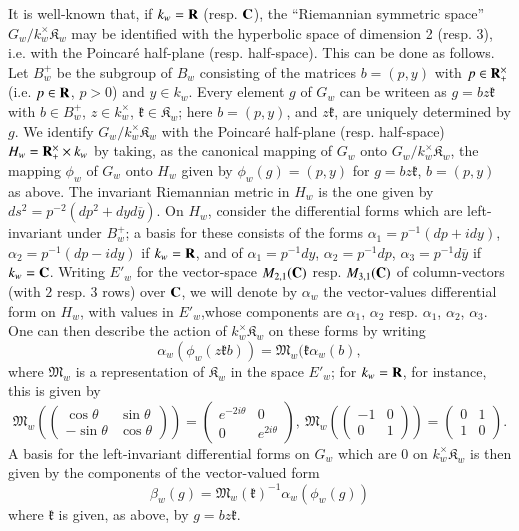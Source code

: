 It is well-known that, if $k_{w}=\mathbf{R}$ (resp. $\mathbf{C}$), the ``Riemannian symmetric space'' $G_{w}/k^{\times}_{w}\mathfrak{K}_{w}$ may be identified with the hyperbolic space of dimension 2 (resp. 3), i.e. with the Poincar\'e half-plane (resp. half-space). This can be done as follows. Let $B^{+}_{w}$ be the subgroup of $B_{w}$ consisting of the matrices $b=(p,y)$ with $p\in \mathbf{R}^{\times}_{+}$ (i.e. $p\in \mathbf{R}$, $p>0$) and $y\in k_{w}$. Every element $g$ of $G_{w}$ can be writeen as $g=bz\mathfrak{k}$ with $b\in B^{+}_{w}$, $z\in k^{\times}_{w}$, $\mathfrak{k}\in \mathfrak{K}_{w}$; here $b=(p,y)$, and $z\mathfrak{k}$, are uniquely determined by $g$. We identify $G_{w}/k^{\times}_{w}\mathfrak{K}_{w}$ with the Poincar\'e half-plane (resp. half-space) $H_{w}=\mathbf{R}^{\times}_{+}\times k_{w}$ by taking, as the canonical mapping of $G_{w}$ onto $G_{w}/k^{\times}_{w}\mathfrak{K}_{w}$, the mapping $\phi_{w}$ of $G_{w}$ onto $H_{w}$ given by $\phi_{w}(g)=(p,y)$ for $g=bz\mathfrak{k}$, $b=(p,y)$ as above. The invariant Riemannian metric in $H_{w}$ is the one given by $ds^{2}=p^{-2}(dp^{2}+dyd\overline{y})$. On $H_{w}$, consider the differential forms which are left-invariant under $B^{+}_{w}$; a basis for these consists of the forms $\alpha_{1}=p^{-1}(dp+idy)$, $\alpha_{2}=p^{-1}(dp-idy)$ if $k_{w}=\mathbf{R}$, and of $\alpha_{1}=p^{-1}dy$, $\alpha_{2}=p^{-1}dp$, $\alpha_{3}=p^{-1}d\overline{y}$ if $k_{w}=\mathbf{C}$. Writing $E'_{w}$ for the vector-space $M_{2,1}(\mathbf{C})$ resp. $M_{3,1}(\mathbf{C})$ of column-vectors (with $2$ resp. $3$ rows) over $\mathbf{C}$, we will denote by $\alpha_{w}$ the vector-values differential form on $H_{w}$, with values in $E'_{w}$,\pageoriginale whose components are $\alpha_{1}$, $\alpha_{2}$ resp. $\alpha_{1}$, $\alpha_{2}$, $\alpha_{3}$. One can then describe the action of $k^{\times}_{w}\mathfrak{K}_{w}$ on these forms by writing
$$
\alpha_{w}(\phi_{w}(z\mathfrak{k}b))=\mathfrak{M}_{w}(\mathfrak{k}\alpha_{w}(b),
$$
where $\mathfrak{M}_{w}$ is a representation of $\mathfrak{K}_{w}$ in the space $E'_{w}$; for $k_{w}=\mathbf{R}$, for instance, this is given by
$$
\mathfrak{M}_{w}
\left(\left(\begin{matrix}
\cos \theta & \sin \theta\\
-\sin \theta & \cos \theta
\end{matrix}\right)\right)=
\left(
\begin{matrix}
e^{-2i\theta} & 0\\
0 & e^{2i\theta}
\end{matrix}
\right), \  
\mathfrak{M}_{w}
\left(\left(
\begin{matrix}
-1 & 0\\
0 & 1
\end{matrix}
\right)\right)
=
\left(
\begin{matrix}
0 & 1\\
1 & 0
\end{matrix}
\right).
$$
A basis for the left-invariant differential forms on $G_{w}$ which are $0$ on $k^{\times}_{w}\mathfrak{K}_{w}$ is then given by the components of the vector-valued form
$$
\beta_{w}(g)=\mathfrak{M}_{w}(\mathfrak{k})^{-1}\alpha_{w}(\phi_{w}(g))
$$
where $\mathfrak{k}$ is given, as above, by $g=bz \mathfrak{k}$.

